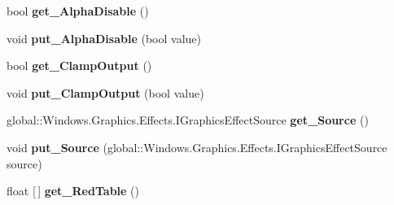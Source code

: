 \begin{DoxyCompactItemize}
bool {\bfseries get\+\_\+\+Alpha\+Disable} ()
\item 
\mbox{\label{interface_microsoft_1_1_graphics_1_1_canvas_1_1_effects_1_1_i_table_transfer_effect_ab2b1dc95352e15f59ccd6e59a841536c}} 
void {\bfseries put\+\_\+\+Alpha\+Disable} (bool value)
\item 
\mbox{\label{interface_microsoft_1_1_graphics_1_1_canvas_1_1_effects_1_1_i_table_transfer_effect_a3171cf19daddbaa01fe64dff11192551}} 
bool {\bfseries get\+\_\+\+Clamp\+Output} ()
\item 
\mbox{\label{interface_microsoft_1_1_graphics_1_1_canvas_1_1_effects_1_1_i_table_transfer_effect_ad0e1b9a732e01325c16c4600c76ba8b8}} 
void {\bfseries put\+\_\+\+Clamp\+Output} (bool value)
\item 
\mbox{\label{interface_microsoft_1_1_graphics_1_1_canvas_1_1_effects_1_1_i_table_transfer_effect_a6993574c08dc257c64caa74420a9b7d9}} 
global\+::\+Windows.\+Graphics.\+Effects.\+I\+Graphics\+Effect\+Source {\bfseries get\+\_\+\+Source} ()
\item 
\mbox{\label{interface_microsoft_1_1_graphics_1_1_canvas_1_1_effects_1_1_i_table_transfer_effect_a0e4a3ffb3cd9b7910d701cdbe5aaaf38}} 
void {\bfseries put\+\_\+\+Source} (global\+::\+Windows.\+Graphics.\+Effects.\+I\+Graphics\+Effect\+Source source)
\item 
\mbox{\label{interface_microsoft_1_1_graphics_1_1_canvas_1_1_effects_1_1_i_table_transfer_effect_ac34ae8be630559f457f3edb956767f01}} 
float \mbox{[}$\,$\mbox{]} {\bfseries get\+\_\+\+Red\+Table} ()
\item 
\mbox{\label{interface_microsoft_1_1_graphics_1_1_canvas_1_1_effects_1_1_i_table_transfer_effect_a20f227b181866caca83fd5613a0832db}} 

\end{DoxyCompactItemize}
